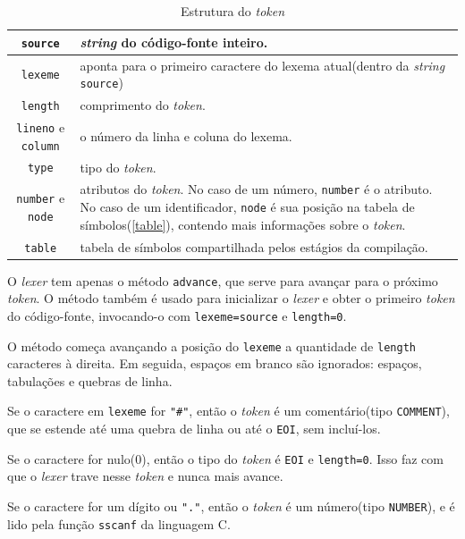 \begin{table}[ht]
\caption{Estrutura do \textit{token}}
\label{token}
\begin{centering}
\begin{tabularx}{\textwidth}{||c|X||}
\hline \texttt{source} & \textit{string} do código-fonte inteiro. \\
\hline \texttt{lexeme} & aponta para o primeiro caractere do lexema atual(dentro da \textit{string} \texttt{source}) \\
\hline \texttt{length} & comprimento do \textit{token}. \\
\hline \texttt{lineno} e \texttt{column} & o número da linha e coluna do lexema. \\
\hline \texttt{type} & tipo do \textit{token}. \\
\hline \texttt{number} e \texttt{node} & atributos do \textit{token}.
No caso de um número, \texttt{number} é o atributo.
No caso de um identificador, \texttt{node} é sua posição na tabela de símbolos(\ref{table}),
contendo mais informações sobre o \textit{token}. \\
\hline \texttt{table} & tabela de símbolos compartilhada pelos estágios da compilação. \\
\hline
\end{tabularx}
\end{centering}
\end{table}

O \textit{lexer} tem apenas o método \texttt{advance}, que serve para avançar
para o próximo \textit{token}. O método também é usado para inicializar o
\textit{lexer} e obter o primeiro \textit{token} do código-fonte,
invocando-o com \texttt{lexeme=source} e \texttt{length=0}.

O método começa avançando a posição do \texttt{lexeme} a quantidade de
\texttt{length} caracteres à direita.
Em seguida, espaços em branco são ignorados: espaços, tabulações e quebras de linha.

Se o caractere em \texttt{lexeme} for \texttt{"\#"}, então o \textit{token} é um
comentário(tipo \texttt{COMMENT}),
que se estende até uma quebra de linha ou até o \texttt{EOI}, sem incluí-los.

Se o caractere for nulo(0), então o tipo do \textit{token} é \texttt{EOI} e \texttt{length=0}.
Isso faz com que o \textit{lexer} trave nesse \textit{token} e nunca mais avance.

Se o caractere for um dígito ou \texttt{"."}, então o \textit{token} é um número(tipo \texttt{NUMBER}),
e é lido pela função \texttt{sscanf} da linguagem C.

